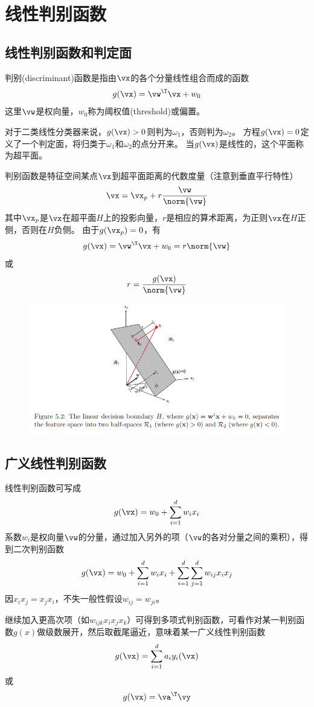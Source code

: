
\section{线性判别函数} %
\subsection{线性判别函数和判定面}
判别(discriminant)函数是指由$\vx$的各个分量线性组合而成的函数
\[g(\vx)=\vw^\T\vx+w_0\]
这里$\vw$是权向量，$w_0$称为阈权值(threshold)或偏置。

对于二类线性分类器来说，$g(\vx)>0$则判为$\omega_1$，否则判为$\omega_2$。
方程$g(\vx)=0$定义了一个判定面，将归类于$\omega_1$和$\omega_2$的点分开来。
当$g(\vx)$是线性的，这个平面称为超平面。

判别函数是特征空间某点$\vx$到超平面距离的代数度量（注意到垂直平行特性）
\[\vx=\vx_p+r\frac{\vw}{\norm{\vw}}\]
其中$\vx_p$是$\vx$在超平面$H$上的投影向量，$r$是相应的算术距离，为正则$\vx$在$H$正侧，否则在$H$负侧。
由于$g(\vx_p)=0$，有
\[g(\vx)=\vw^\T\vx+w_0=r\norm{\vw}\]
或
\[r=\frac{g(\vx)}{\norm{\vw}}\]
\begin{figure}[H]
\centering
\includegraphics[width=0.9\linewidth]{fig/linear_decision_boundary.png}
\end{figure}

\subsection{广义线性判别函数}
线性判别函数可写成
\[g(\vx)=w_0+\sum_{i=1}^d w_i x_i\]
系数$w_i$是权向量$\vw$的分量，通过加入另外的项（$\vw$的各对分量之间的乘积），得到二次判别函数
\[g(\vx)=w_0+\sum_{i=1}^d w_ix_i+\sum_{i=1}^d\sum_{j=1}^d w_{ij}x_ix_j\]
因$x_ix_j=x_jx_i$，不失一般性假设$w_{ij}=w_{ji}$。

继续加入更高次项（如$w_{ijk}x_ix_jx_k$）可得到多项式判别函数，可看作对某一判别函数$g(x)$做级数展开，然后取截尾逼近，意味着某一广义线性判别函数
\[g(\vx)=\sum_{i=1}^d a_iy_i(\vx)\]
或
\[g(\vx)=\va^\T\vy\]

